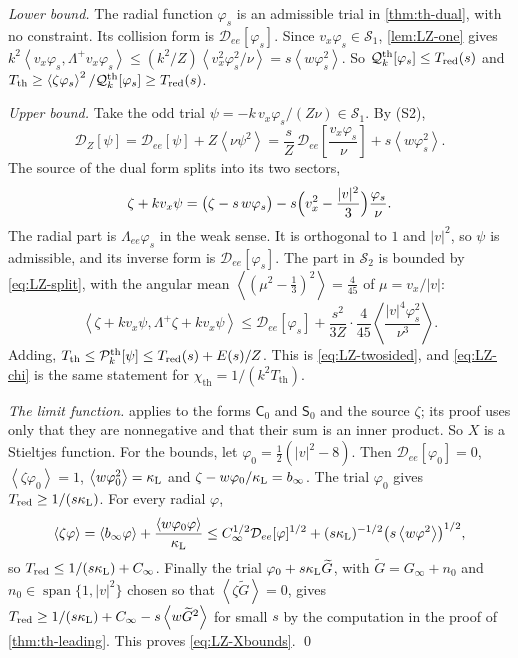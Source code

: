 \documentclass[11pt]{article}
\newcommand{\av}[1]{\left\langle #1\right\rangle}
\newcommand{\D}{\mathcal D}
\newcommand{\kap}{\kappa}
\newcommand{\thr}{\mathrm{th}}
\newcommand{\Qth}{\mathcal Q^{\thr}}
\newcommand{\Pth}{\mathcal P^{\thr}}
\newcommand{\dual}[1]{\left\langle #1,\Lambda^+ #1\right\rangle}
\theoremstyle{definition}
\theoremstyle{remark}
\numberwithin{equation}{section}
\begin{document}
\emph{Lower bound.} The radial function $\varphi_s$ is an admissible trial
in \cref{thm:th-dual}, with no constraint. Its collision form is
$\D_{ee}[\varphi_s]$. Since $v_x\varphi_s\in\mathcal S_1$,
\cref{lem:LZ-one} gives
$k^2\dual{v_x\varphi_s}\leq(k^2/Z)\av{v_x^2\varphi_s^2/\nu}
=s\av{w\varphi_s^2}$. So $\Qth_k[\varphi_s]\leq T_{\rm red}(s)$ and
$T_\thr\geq\av{\zeta\varphi_s}^2/\Qth_k[\varphi_s]\geq T_{\rm red}(s)$.

\emph{Upper bound.} Take the odd trial
$\psi=-k\,v_x\varphi_s/(Z\nu)\in\mathcal S_1$. By (S2),
\[
 \D_Z[\psi]=\D_{ee}[\psi]+Z\av{\nu\psi^2}
  =\frac sZ\,\D_{ee}\!\left[\frac{v_x\varphi_s}{\nu}\right]
   +s\av{w\varphi_s^2}.
\]
The source of the dual form splits into its two sectors,
\[
 \zeta+kv_x\psi=\bigl(\zeta-s\,w\varphi_s\bigr)
   -s\Bigl(v_x^2-\frac{|v|^2}{3}\Bigr)\frac{\varphi_s}{\nu}.
\]
The radial part is $\Lambda_{ee}\varphi_s$ in the weak sense. It is
orthogonal to $1$ and $|v|^2$, so $\psi$ is admissible, and its inverse
form is $\D_{ee}[\varphi_s]$. The part in $\mathcal S_2$ is bounded by
\eqref{eq:LZ-split}, with the angular mean
$\av{(\mu^2-\tfrac13)^2}=\tfrac4{45}$ of $\mu=v_x/|v|$:
\[
 \dual{\zeta+kv_x\psi}\leq\D_{ee}[\varphi_s]
   +\frac{s^2}{3Z}\cdot\frac4{45}\av{\frac{|v|^4\varphi_s^2}{\nu^3}} .
\]
Adding, $T_\thr\leq\Pth_k[\psi]\leq T_{\rm red}(s)+E(s)/Z$. This is
\eqref{eq:LZ-twosided}, and \eqref{eq:LZ-chi} is the same statement for
$\chi_\thr=1/(k^2T_\thr)$.

\emph{The limit function.}  applies to the forms
$\mathsf C_0$ and $\mathsf S_0$ and the source $\zeta$; its proof uses
only that they are nonnegative and that their sum is an inner product. So
$X$ is a Stieltjes function. For the bounds, let
$\varphi_0=\tfrac12(|v|^2-8)$. Then $\D_{ee}[\varphi_0]=0$,
$\av{\zeta\varphi_0}=1$, $\av{w\varphi_0^2}=\kap_{\rm L}$ and
$\zeta-w\varphi_0/\kap_{\rm L}=b_\infty$. The trial $\varphi_0$ gives
$T_{\rm red}\geq1/(s\kap_{\rm L})$. For every radial $\varphi$,
\[
 \av{\zeta\varphi}=\av{b_\infty\varphi}+\frac{\av{w\varphi_0\varphi}}{\kap_{\rm L}}
 \leq C_\infty^{1/2}\D_{ee}[\varphi]^{1/2}
   +(s\kap_{\rm L})^{-1/2}\bigl(s\av{w\varphi^2}\bigr)^{1/2},
\]
so $T_{\rm red}\leq1/(s\kap_{\rm L})+C_\infty$. Finally the trial
$\varphi_0+s\kap_{\rm L}\widetilde G$, with
$\widetilde G=G_\infty+n_0$ and $n_0\in\operatorname{span}\{1,|v|^2\}$
chosen so that $\av{\zeta\widetilde G}=0$, gives
$T_{\rm red}\geq1/(s\kap_{\rm L})+C_\infty-s\av{w\widetilde G^2}$ for small
$s$ by the computation in the proof of \cref{thm:th-leading}. This proves
\eqref{eq:LZ-Xbounds}. \qed
\end{document}
